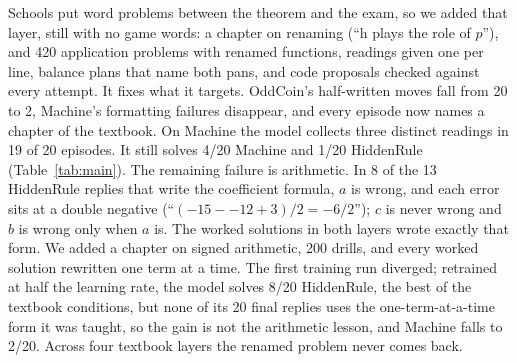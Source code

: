 \documentclass[11pt]{article}
\begin{document}
Schools put word problems between the theorem and the exam, so we added that layer, still with no game words: a
chapter on renaming (``h plays the role of $p$''), and 420 application problems with renamed functions, readings
given one per line, balance plans that name both pans, and code proposals checked against every attempt. It fixes
what it targets. OddCoin's half-written moves fall from 20 to 2, Machine's formatting failures disappear, and every
episode now names a chapter of the textbook. On Machine the model collects three distinct readings in 19 of 20 episodes. It still solves
4/20 Machine and 1/20 HiddenRule (Table~\ref{tab:main}). The remaining failure is arithmetic. In 8 of the 13
HiddenRule replies that write the coefficient formula, $a$ is wrong, and each error sits at a double negative
(``$(-15 - -12 + 3)/2 = -6/2$''); $c$ is never wrong and $b$ is wrong only when $a$ is. The worked solutions in
both layers wrote exactly that form. We added a chapter on signed arithmetic, 200 drills, and every worked
solution rewritten one term at a time. The first training run diverged; retrained at half the learning rate, the
model solves 8/20 HiddenRule, the best of the textbook conditions, but none of its 20 final replies uses the
one-term-at-a-time form it was taught, so the gain is not the arithmetic lesson, and Machine falls to 2/20. Across
four textbook layers the renamed problem never comes back.
\end{document}
